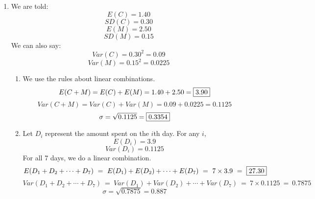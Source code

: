 \documentclass[12pt,letterpaper]{article}
\begin{document}
\begin{enumerate}
\item We are told:
$$E(C) = 1.40 $$
$$SD(C) = 0.30 $$
$$E(M) = 2.50 $$
$$SD(M) = 0.15 $$
We can also say:
$$Var(C) = 0.30^2 = 0.09 $$
$$Var(M) = 0.15^2 = 0.0225 $$
\begin{enumerate}
\item We use the rules about linear combinations.
$$E(C+M) = E(C)+E(M) = 1.40+2.50 = \fbox{3.90} $$
$$Var(C+M) = Var(C)+Var(M) = 0.09+0.0225 = 0.1125 $$
$$\sigma = \sqrt{0.1125} = \fbox{0.3354} $$
\item Let $D_i$ represent the amount spent on the $i$th day. For any $i$,
$$E(D_i) = 3.9$$
$$Var(D_i) = 0.1125$$
For all 7 days, we do a linear combination.
$$E(D_1+D_2+\cdots+D_7) ~=~ E(D_1)+E(D_2)+\cdots+E(D_7) ~=~ 7\times3.9 ~=~ \fbox{27.30} $$
$$Var(D_1+D_2+\cdots+D_7) ~=~ Var(D_1)+Var(D_2)+\cdots+Var(D_7) ~=~ 7\times0.1125 ~=~ 0.7875 $$
$$\sigma = \sqrt{0.7875} = 0.887 $$
\end{enumerate}

\end{enumerate}
\end{document}
